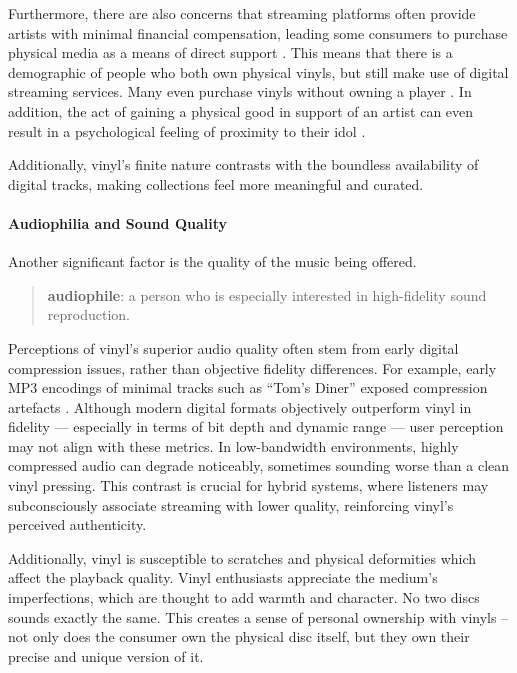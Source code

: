                 Furthermore, there are also concerns that streaming platforms often provide artists with minimal financial compensation, leading some consumers to purchase physical media as a means of direct support \cite{historyandrevivalofvinyls}. This means that there is a demographic of people who both own physical vinyls, but still make use of digital streaming services. Many even purchase vinyls without owning a player \cite{Trapp2023}. In addition, the act of gaining a physical good in support of an artist can even result in a psychological feeling of proximity to their idol \cite{historyandrevivalofvinyls}.
                
                Additionally, vinyl's finite nature contrasts with the boundless availability of digital tracks, making collections feel more meaningful and curated.
    
            \paragraph{Audiophilia and Sound Quality}
    
                Another significant factor is the quality of the music being offered.
    
                \begin{quote}
                    \textbf{audiophile}: a person who is especially interested in high-fidelity sound reproduction. \cite{audiophile2025}
                \end{quote}
    
                Perceptions of vinyl’s superior audio quality often stem from early digital compression issues, rather than objective fidelity differences. For example, early MP3 encodings of minimal tracks such as ``Tom’s Diner'' exposed compression artefacts \cite{maguire2014ghost}. Although modern digital formats objectively outperform vinyl in fidelity — especially in terms of bit depth and dynamic range — user perception may not align with these metrics. In low-bandwidth environments, highly compressed audio can degrade noticeably, sometimes sounding worse than a clean vinyl pressing. This contrast is crucial for hybrid systems, where listeners may subconsciously associate streaming with lower quality, reinforcing vinyl’s perceived authenticity.
    
                Additionally, vinyl is susceptible to scratches and physical deformities which affect the playback quality. Vinyl enthusiasts appreciate the medium’s imperfections, which are thought to add warmth and character. No two discs sounds exactly the same. This creates a sense of personal ownership with vinyls -- not only does the consumer own the physical disc itself, but they own their precise and unique version of it.
    
